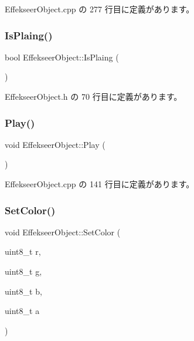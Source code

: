  Effekseer\+Object.\+cpp の 277 行目に定義があります。

\mbox{\label{class_effekseer_object_a6fe253dd3387bdfd9305878ff194f305}} 
\subsubsection{\texorpdfstring{Is\+Plaing()}{IsPlaing()}}
{\footnotesize\ttfamily bool Effekseer\+Object\+::\+Is\+Plaing (\begin{DoxyParamCaption}{ }\end{DoxyParamCaption})\hspace{0.3cm}{\ttfamily [inline]}}



 Effekseer\+Object.\+h の 70 行目に定義があります。

\mbox{\label{class_effekseer_object_a59c8a12b4eb558449622660d892b3cf4}} 
\subsubsection{\texorpdfstring{Play()}{Play()}}
{\footnotesize\ttfamily void Effekseer\+Object\+::\+Play (\begin{DoxyParamCaption}{ }\end{DoxyParamCaption})}



 Effekseer\+Object.\+cpp の 141 行目に定義があります。

\mbox{\label{class_effekseer_object_a5c496e56785ef7b784b13642d59d4e7f}} 
\subsubsection{\texorpdfstring{Set\+Color()}{SetColor()}}
{\footnotesize\ttfamily void Effekseer\+Object\+::\+Set\+Color (\begin{DoxyParamCaption}\item[{uint8\+\_\+t}]{r,  }\item[{uint8\+\_\+t}]{g,  }\item[{uint8\+\_\+t}]{b,  }\item[{uint8\+\_\+t}]{a }\end{DoxyParamCaption})}



